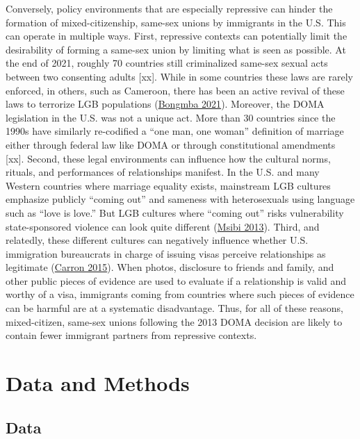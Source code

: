 \documentclass[
  12pt,
]{article}
\begin{document}
Conversely, policy environments that are especially repressive can hinder the formation of mixed-citizenship, same-sex unions by immigrants in the U.S. This can operate in multiple ways. First, repressive contexts can potentially limit the desirability of forming a same-sex union by limiting what is seen as possible. At the end of 2021, roughly 70 countries still criminalized same-sex sexual acts between two consenting adults {[}xx{]}. While in some countries these laws are rarely enforced, in others, such as Cameroon, there has been an active revival of these laws to terrorize LGB populations (\protect\hyperlink{ref-bongmba_2021_samesex}{Bongmba 2021}). Moreover, the DOMA legislation in the U.S. was not a unique act. More than 30 countries since the 1990s have similarly re-codified a ``one man, one woman'' definition of marriage either through federal law like DOMA or through constitutional amendments {[}xx{]}. Second, these legal environments can influence how the cultural norms, rituals, and performances of relationships manifest. In the U.S. and many Western countries where marriage equality exists, mainstream LGB cultures emphasize publicly ``coming out'' and sameness with heterosexuals using language such as ``love is love.'' But LGB cultures where ``coming out'' risks vulnerability state-sponsored violence can look quite different (\protect\hyperlink{ref-msibi_2013_denied}{Msibi 2013}). Third, and relatedly, these different cultures can negatively influence whether U.S. immigration bureaucrats in charge of issuing visas perceive relationships as legitimate (\protect\hyperlink{ref-carron_2015_marriagebased}{Carron 2015}). When photos, disclosure to friends and family, and other public pieces of evidence are used to evaluate if a relationship is valid and worthy of a visa, immigrants coming from countries where such pieces of evidence can be harmful are at a systematic disadvantage. Thus, for all of these reasons, mixed-citizen, same-sex unions following the 2013 DOMA decision are likely to contain fewer immigrant partners from repressive contexts.

\hypertarget{data-and-methods}{%
\section{Data and Methods}\label{data-and-methods}}

\hypertarget{data}{%
\subsection{Data}\label{data}}
\end{document}
